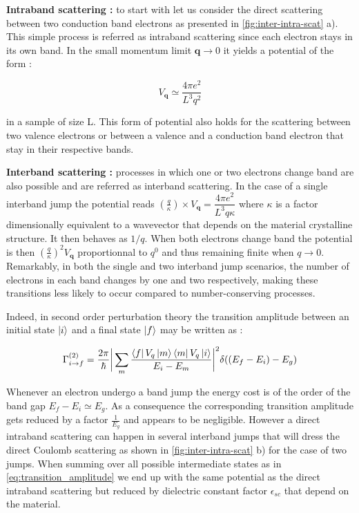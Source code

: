 \textbf{Intraband scattering :}
to start with let us consider the direct scattering between two conduction band electrons as presented in \autoref{fig:inter-intra-scat} a). This simple process is referred as intraband scattering since each electron stays in its own band. In the small momentum limit $\mathrm{\textbf{q}}\to 0$ it yields a potential of the form \cite{Combescot_cooper_excitons_2015}:

\begin{equation}
    V_{\textbf{q}} \simeq \dfrac{4\pi e^2}{L^3 q^2}
\end{equation}
 
\noindent in a sample of size L. This form of potential also holds for the scattering between two valence electrons or between a valence and a conduction band electron that stay in their respective bands.

\bigskip

\textbf{Interband scattering :}
processes in which one or two electrons change band are also possible and are referred as interband scattering. In the case of a single 
interband jump the potential reads $(\frac{q}{\kappa})\times V_{\textbf{q}}= \dfrac{4\pi e^2}{L^3 q \kappa}$ where $\kappa$ is a factor dimensionally equivalent to a wavevector that depends on the material crystalline structure. It then behaves as $1/q$. When both electrons change band the potential is then $(\frac{q}{\kappa})^2V_{\textbf{q}}$ proportionnal to $q^0$
and thus remaining finite when $q\to 0$. Remarkably, in both the single and two interband jump scenarios, the number of electrons in each band changes by one and two respectively, making these transitions less likely to occur compared to number-conserving processes.

\bigskip
Indeed, in second order perturbation theory the transition amplitude between an initial state $\ket{i}$ and a final state $\ket{f}$ may be written as :

\begin{equation}
    \Gamma_{i\to f}^{(2)} = \dfrac{2\pi}{\hbar} \bigg \vert \sum_{m} \dfrac{\bra{f}V_q\ket{m}\bra{m}V_q\ket{i}}{E_i - E_m}\bigg \vert^2 \delta((E_f - E_i)-E_g)
    \label{eq:transition_amplitude}
\end{equation}

\noindent Whenever an electron undergo a band jump the energy cost is of the order of the band gap $E_f - E_i \simeq E_g$. As a consequence the corresponding transition amplitude gets reduced by a factor $\frac{1}{E_g}$ and appears to be negligible.
 However a direct intraband scattering can happen in several interband jumps that will dress the direct Coulomb scattering as shown in \autoref{fig:inter-intra-scat} b) for the case of two jumps. When summing over all possible intermediate states as in \eqref{eq:transition_amplitude} we end up with the same potential as the direct intraband scattering but reduced by dielectric constant factor $\epsilon_{sc}$ that depend on the material.


